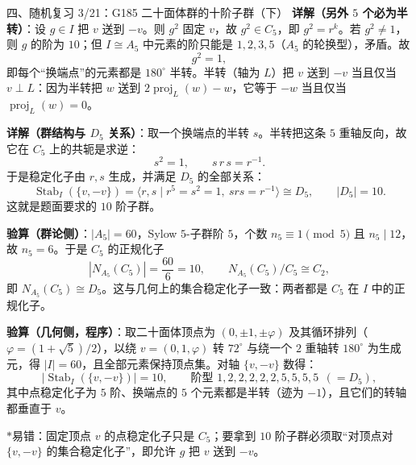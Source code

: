 \documentclass[aspectratio=169,10pt,fontset=none]{ctexbeamer}
\newcommand{\key}[1]{\textcolor{ink}{\bfseries #1}}
\newcommand{\starpt}{\textcolor{accent}{\bfseries$\ast$}}
\begin{document}
\begin{frame}[t]{四、随机复习 3/21：G185 二十面体群的十阶子群（下）}
\scriptsize
\key{详解（另外 $5$ 个必为半转）}：设 $g\in I$ 把 $v$ 送到 $-v$。则 $g^2$ 固定 $v$，故 $g^2\in C_5$，即 $g^2=r^k$。若 $g^2\ne1$，则 $g$ 的阶为 $10$；但 $I\cong A_5$ 中元素的阶只能是 $1,2,3,5$（$A_5$ 的轮换型），矛盾。故
\[ g^2=1, \]
即每个“换端点”的元素都是 $180^\circ$ 半转。半转（轴为 $L$）把 $v$ 送到 $-v$ 当且仅当 $v\perp L$：因为半转把 $w$ 送到 $2\operatorname{proj}_L(w)-w$，它等于 $-w$ 当且仅当 $\operatorname{proj}_L(w)=0$。

\key{详解（群结构与 $D_5$ 关系）}：取一个换端点的半转 $s$。半转把这条 $5$ 重轴反向，故它在 $C_5$ 上的共轭是求逆：
\[ s^2=1,\qquad s\,r\,s=r^{-1}. \]
于是稳定化子由 $r,s$ 生成，并满足 $D_5$ 的全部关系：
\[ \operatorname{Stab}_I(\{v,-v\})=\langle r,s\mid r^5=s^2=1,\ srs=r^{-1}\rangle\cong D_5,\qquad |D_5|=10. \]
这就是题面要求的 $10$ 阶子群。

\key{验算（群论侧）}：$|A_5|=60$，Sylow $5$-子群阶 $5$，个数 $n_5\equiv1\pmod 5$ 且 $n_5\mid 12$，故 $n_5=6$。于是 $C_5$ 的正规化子
\[ |N_{A_5}(C_5)|=\frac{60}{6}=10,\qquad N_{A_5}(C_5)/C_5\cong C_2, \]
即 $N_{A_5}(C_5)\cong D_5$。这与几何上的集合稳定化子一致：两者都是 $C_5$ 在 $I$ 中的正规化子。

\key{验算（几何侧，程序）}：取二十面体顶点为 $(0,\pm1,\pm\varphi)$ 及其循环排列（$\varphi=(1+\sqrt5)/2$），以绕 $v=(0,1,\varphi)$ 转 $72^\circ$ 与绕一个 $2$ 重轴转 $180^\circ$ 为生成元，得 $|I|=60$，且全部元素保持顶点集。对轴 $\{v,-v\}$ 数得：
\[ |\operatorname{Stab}_I(\{v,-v\})|=10,\qquad \text{阶型 } 1,2,2,2,2,2,5,5,5,5\ \ (=D_5), \]
其中点稳定化子为 $5$ 阶、换端点的 $5$ 个元素都是半转（迹为 $-1$），且它们的转轴都垂直于 $v$。

\starpt 易错：固定顶点 $v$ 的点稳定化子只是 $C_5$；要拿到 $10$ 阶子群必须取“对顶点对 $\{v,-v\}$ 的集合稳定化子”，即允许 $g$ 把 $v$ 送到 $-v$。
\end{frame}
\end{document}

